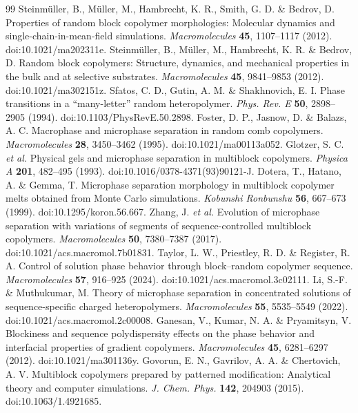 \documentclass[pdflatex,sn-nature,onecolumn]{sn-jnl}
\begin{document}
\begin{thebibliography}{99}
 Steinm\"uller, B., M\"uller, M., Hambrecht, K. R., Smith, G. D. \& Bedrov, D. Properties of random block copolymer morphologies: Molecular dynamics and single-chain-in-mean-field simulations. \textit{Macromolecules} \textbf{45}, 1107--1117 (2012). doi:10.1021/ma202311e.
 Steinm\"uller, B., M\"uller, M., Hambrecht, K. R. \& Bedrov, D. Random block copolymers: Structure, dynamics, and mechanical properties in the bulk and at selective substrates. \textit{Macromolecules} \textbf{45}, 9841--9853 (2012). doi:10.1021/ma302151z.
 Sfatos, C. D., Gutin, A. M. \& Shakhnovich, E. I. Phase transitions in a ``many-letter'' random heteropolymer. \textit{Phys. Rev. E} \textbf{50}, 2898--2905 (1994). doi:10.1103/PhysRevE.50.2898.
 Foster, D. P., Jasnow, D. \& Balazs, A. C. Macrophase and microphase separation in random comb copolymers. \textit{Macromolecules} \textbf{28}, 3450--3462 (1995). doi:10.1021/ma00113a052.
 Glotzer, S. C. \textit{et al.} Physical gels and microphase separation in multiblock copolymers. \textit{Physica A} \textbf{201}, 482--495 (1993). doi:10.1016/0378-4371(93)90121-J.
 Dotera, T., Hatano, A. \& Gemma, T. Microphase separation morphology in multiblock copolymer melts obtained from Monte Carlo simulations. \textit{Kobunshi Ronbunshu} \textbf{56}, 667--673 (1999). doi:10.1295/koron.56.667.
 Zhang, J. \textit{et al.} Evolution of microphase separation with variations of segments of sequence-controlled multiblock copolymers. \textit{Macromolecules} \textbf{50}, 7380--7387 (2017). doi:10.1021/acs.macromol.7b01831.
 Taylor, L. W., Priestley, R. D. \& Register, R. A. Control of solution phase behavior through block--random copolymer sequence. \textit{Macromolecules} \textbf{57}, 916--925 (2024). doi:10.1021/acs.macromol.3c02111.
 Li, S.-F. \& Muthukumar, M. Theory of microphase separation in concentrated solutions of sequence-specific charged heteropolymers. \textit{Macromolecules} \textbf{55}, 5535--5549 (2022). doi:10.1021/acs.macromol.2c00008.
 Ganesan, V., Kumar, N. A. \& Pryamitsyn, V. Blockiness and sequence polydispersity effects on the phase behavior and interfacial properties of gradient copolymers. \textit{Macromolecules} \textbf{45}, 6281--6297 (2012). doi:10.1021/ma301136y.
 Govorun, E. N., Gavrilov, A. A. \& Chertovich, A. V. Multiblock copolymers prepared by patterned modification: Analytical theory and computer simulations. \textit{J. Chem. Phys.} \textbf{142}, 204903 (2015). doi:10.1063/1.4921685.

\end{thebibliography}
\end{document}
